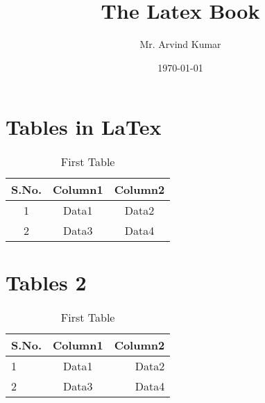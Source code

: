 \documentclass{book}
\begin{document}
	\title{The Latex Book}
	\author{Mr. Arvind Kumar}
	\date{\today}
	\maketitle
	\tableofcontents
	\newpage
	\chapter{Tables in LaTex}
	\begin{table}[ht]
		\centering
		\begin{tabular}{|c|c|c|}
			\hline
			S.No. & Column1 & Column2\\
			\hline
			1 & Data1 & Data2 \\
			\hline
			2 & Data3 & Data4 \\
			\hline
	    \end{tabular}
	\caption{First Table}
	\label{tab:firsttable}
	\end{table}

	\chapter{Tables 2}
		\begin{table}[ht]
		\centering
		\begin{tabular}{|l|c|r|}
		\hline
		S.No. & Column1 & Column2\\
		\hline
		1 & Data1 & Data2 \\
		\hline
		2 & Data3 & Data4 \\
		\hline
	\end{tabular}
	\caption{First Table}
	\label{tab:secondtable}
\end{table}
\end{document}
